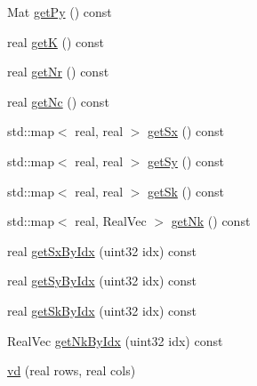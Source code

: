 \begin{DoxyCompactItemize}
Mat \mbox{\hyperlink{classvd_a9738711704b1d03cdbe027b1976cb0c6}{get\+Py}} () const
\item 
real \mbox{\hyperlink{classvd_a624f53ae4a7012f267111359e9245f81}{getK}} () const
\item 
real \mbox{\hyperlink{classvd_a1a1634d6906eb0af4d877c2af3292ca7}{get\+Nr}} () const
\item 
real \mbox{\hyperlink{classvd_ab0de0a5b8929ed7a7bb6ca902a462dd4}{get\+Nc}} () const
\item 
std\+::map$<$ real, real $>$ \mbox{\hyperlink{classvd_a340f3f92b9ae32ff0f3eb2ce6cf12bd6}{get\+Sx}} () const
\item 
std\+::map$<$ real, real $>$ \mbox{\hyperlink{classvd_a13a2a103b632b3acf41b925b5b31449e}{get\+Sy}} () const
\item 
std\+::map$<$ real, real $>$ \mbox{\hyperlink{classvd_a5c6dc6e749c955b5ee26139e19a02e0b}{get\+Sk}} () const
\item 
std\+::map$<$ real, Real\+Vec $>$ \mbox{\hyperlink{classvd_a90613fc46f246a5450e26487caff33f9}{get\+Nk}} () const
\item 
real \mbox{\hyperlink{classvd_a960d4b8fbedb7cbb0686ad42e19d6396}{get\+Sx\+By\+Idx}} (uint32 idx) const
\item 
real \mbox{\hyperlink{classvd_a0f630fc80e57d3e17ab036f75afde006}{get\+Sy\+By\+Idx}} (uint32 idx) const
\item 
real \mbox{\hyperlink{classvd_a4d2c835e7804c4242dce6d411f01ce0a}{get\+Sk\+By\+Idx}} (uint32 idx) const
\item 
Real\+Vec \mbox{\hyperlink{classvd_a4d058d2d1d675a741a83776c95b2acfb}{get\+Nk\+By\+Idx}} (uint32 idx) const
\item 
\mbox{\hyperlink{classvd_a765c16ee377a2a0f9651d555edd3a158}{vd}} (real rows, real cols)
\end{DoxyCompactItemize}

